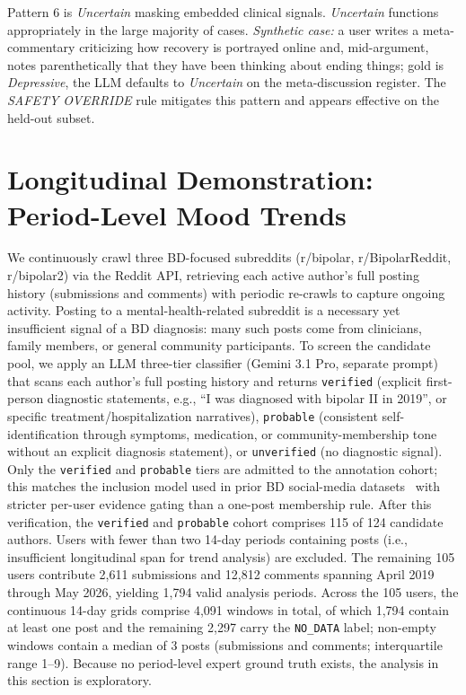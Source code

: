 \documentclass[runningheads]{llncs}
\begin{document}
Pattern 6 is \emph{Uncertain} masking embedded clinical signals. \emph{Uncertain} functions appropriately in the large majority of cases. \emph{Synthetic case:} a user writes a meta-commentary criticizing how recovery is portrayed online and, mid-argument, notes parenthetically that they have been thinking about ending things; gold is \emph{Depressive}, the LLM defaults to \emph{Uncertain} on the meta-discussion register. The \emph{SAFETY OVERRIDE} rule mitigates this pattern and appears effective on the held-out subset.

\section{Longitudinal Demonstration: Period-Level Mood Trends}
\label{sec:pilot}

We continuously crawl three BD-focused subreddits (r/bipolar, r/BipolarReddit, r/bipolar2) via the Reddit API, retrieving each active author's full posting history (submissions and comments) with periodic re-crawls to capture ongoing activity. Posting to a mental-health-related subreddit is a necessary yet insufficient signal of a BD diagnosis: many such posts come from clinicians, family members, or general community participants. To screen the candidate pool, we apply an LLM three-tier classifier (Gemini 3.1 Pro, separate prompt) that scans each author's full posting history and returns \texttt{verified} (explicit first-person diagnostic statements, e.g., ``I was diagnosed with bipolar II in 2019'', or specific treatment/hospitalization narratives), \texttt{probable} (consistent self-identification through symptoms, medication, or community-membership tone without an explicit diagnosis statement), or \texttt{unverified} (no diagnostic signal). Only the \texttt{verified} and \texttt{probable} tiers are admitted to the annotation cohort; this matches the inclusion model used in prior BD social-media datasets~\cite{jagfeld2021understanding,sekulic2018not} with stricter per-user evidence gating than a one-post membership rule. After this verification, the \texttt{verified} and \texttt{probable} cohort comprises 115 of 124 candidate authors. Users with fewer than two 14-day periods containing posts (i.e., insufficient longitudinal span for trend analysis) are excluded. The remaining 105 users contribute 2,611 submissions and 12,812 comments spanning April 2019 through May 2026, yielding 1,794 valid analysis periods. Across the 105 users, the continuous 14-day grids comprise 4,091 windows in total, of which 1,794 contain at least one post and the remaining 2,297 carry the \texttt{NO\_DATA} label; non-empty windows contain a median of 3 posts (submissions and comments; interquartile range 1--9). Because no period-level expert ground truth exists, the analysis in this section is exploratory.
\end{document}
